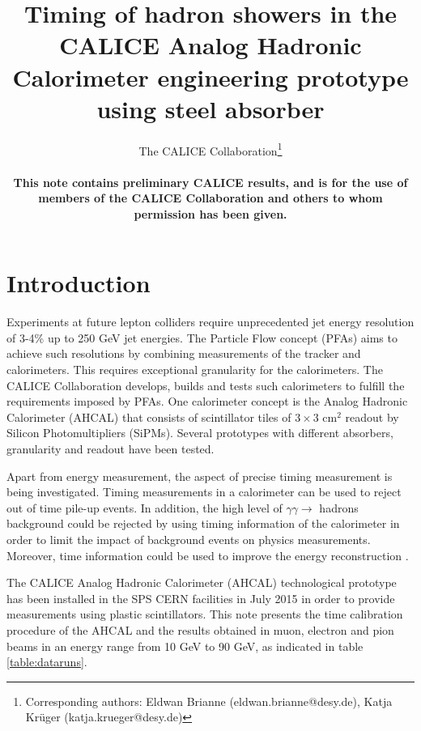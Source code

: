 \documentclass{JINST}
\title{Timing of hadron showers in the CALICE Analog Hadronic Calorimeter engineering prototype using steel absorber}
\author{The CALICE Collaboration\thanks{Corresponding authors: Eldwan Brianne (eldwan.brianne@desy.de), Katja Kr\"uger (katja.krueger@desy.de) } \\
  \vspace{10 mm}

  {\rm \bf \normalsize This note contains preliminary CALICE results, and is for the use of members of the CALICE Collaboration and others to whom permission has been given.}
  }
\begin{document}
\section{Introduction}

Experiments at future lepton colliders require unprecedented jet energy resolution of 3-4\% up to 250 GeV jet energies. The Particle Flow concept (PFAs) aims to achieve such resolutions by combining measurements of the tracker and calorimeters. This requires exceptional granularity for the calorimeters. The CALICE Collaboration develops, builds and tests such calorimeters to fulfill the requirements imposed by PFAs. One calorimeter concept is the Analog Hadronic Calorimeter (AHCAL) that consists of scintillator tiles of $3\times3$ cm$^2$ readout by Silicon Photomultipliers (SiPMs). Several prototypes with different absorbers, granularity and readout have been tested.

Apart from energy measurement, the aspect of precise timing measurement is being investigated. Timing measurements in a calorimeter can be used to reject out of time pile-up events. In addition, the high level of $\gamma\gamma \rightarrow$ hadrons background could be rejected by using timing information of the calorimeter in order to limit the impact of background events on physics measurements. Moreover, time information could be used to improve the energy reconstruction \cite{Benaglia2016}.


The CALICE Analog Hadronic Calorimeter (AHCAL) technological prototype \cite{Sefkow:316196, Krueger:205287} has been installed in the SPS CERN facilities in July 2015 in order to provide measurements using plastic scintillators. This note presents the time calibration procedure of the AHCAL and the results obtained in muon, electron and pion beams in an energy range from 10 GeV to 90 GeV, as indicated in table \ref{table:dataruns}.
\end{document}
